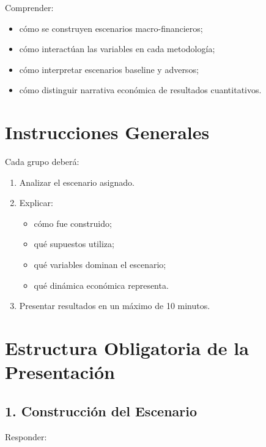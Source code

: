 \documentclass[12pt]{article}
\begin{document}
Comprender:

\begin{itemize}
    \item cómo se construyen escenarios macro-financieros;
    \item cómo interactúan las variables en cada metodología;
    \item cómo interpretar escenarios baseline y adversos;
    \item cómo distinguir narrativa económica de resultados cuantitativos.
\end{itemize}

\vspace{0.5cm}

\section*{Instrucciones Generales}

Cada grupo deberá:

\begin{enumerate}
    \item Analizar el escenario asignado.
    
    \item Explicar:
    
    \begin{itemize}
        \item cómo fue construido;
        \item qué supuestos utiliza;
        \item qué variables dominan el escenario;
        \item qué dinámica económica representa.
    \end{itemize}
    
    \item Presentar resultados en un máximo de 10 minutos.
\end{enumerate}

\vspace{0.5cm}

\section*{Estructura Obligatoria de la Presentación}

\subsection*{1. Construcción del Escenario}

Responder:
\end{document}
